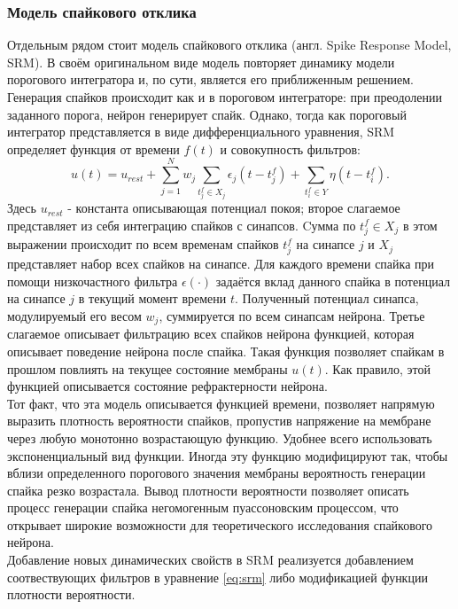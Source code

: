 \documentclass[a4paper,10pt]{article}
\begin{document}
\subsubsection{Модель спайкового отклика}\label{sec:srm}
\indent Отдельным рядом стоит модель спайкового отклика (англ. Spike Response Model, SRM). В своём оригинальном виде модель повторяет динамику модели порогового интегратора и, по сути, является его приближенным решением.\\ 
\indent Генерация спайков происходит как и в пороговом интеграторе: при преодолении заданного порога, нейрон генерирует спайк. Однако, тогда как пороговый интегратор представляется в виде дифференциального уравнения, SRM определяет функция от времени $f(t)$ и совокупность фильтров:
\begin{equation}\label{eq:srm}
u(t) = u_{rest} + \sum_{j=1}^N w_{j} \sum_{t^{f}_{j} \in X_{j}} \epsilon_{j}(t-t^{f}_{j}) + \sum_{t^{f}_{i}\in Y}\eta(t-t^{f}_{i}).
\end{equation}
Здесь $u_{rest}$ - константа описывающая потенциал покоя; второе слагаемое представляет из себя интеграцию спайков с синапсов. Cумма по $t^{f}_{j} \in X_{j}$ в этом выражении происходит по всем временам спайков $t^{f}_{j}$ на синапсе $j$ и $X_{j}$ представляет набор всех спайков на синапсе. Для каждого времени спайка при помощи низкочастного фильтра $\epsilon(\cdot)$ задаётся вклад данного спайка в потенциал на синапсе $j$ в текущий момент времени $t$. Полученный потенциал синапса, модулируемый его весом $w_{j}$, суммируется по всем синапсам нейрона. Третье слагаемое описывает фильтрацию всех спайков нейрона функцией, которая описывает поведение нейрона после спайка. Такая функция позволяет спайкам в прошлом повлиять на текущее состояние мембраны $u(t)$. Как правило, этой функцией описывается состояние рефрактерности нейрона.\\
\indent Тот факт, что эта модель описывается функцией времени, позволяет напрямую выразить плотность вероятности спайков, пропустив напряжение на мембране через любую монотонно возрастающую функцию. Удобнее всего использовать экспоненциальный вид функции. Иногда эту функцию модифицируют так, чтобы вблизи определенного порогового значения мембраны вероятность генерации спайка резко возрастала. Вывод плотности вероятности позволяет описать процесс генерации спайка негомогенным пуассоновским процессом, что открывает широкие возможности для теоретического исследования спайкового нейрона.\\
\indent Добавление новых динамических свойств в SRM реализуется добавлением соотвествующих фильтров в уравнение \eqref{eq:srm} либо модификацией функции плотности вероятности\cite{TripleAdapt,AdaptThesis}. 
\end{document}
